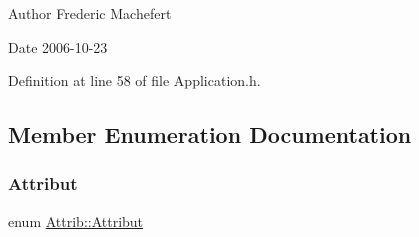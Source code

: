 \begin{DoxyAuthor}{Author}
Frederic Machefert 
\end{DoxyAuthor}
\begin{DoxyDate}{Date}
2006-\/10-\/23 
\end{DoxyDate}


Definition at line 58 of file Application.\+h.



\subsection{Member Enumeration Documentation}
\mbox{\label{classAttrib_a69e171d7cc6417835a5a306d3c764235}} 
\subsubsection{\texorpdfstring{Attribut}{Attribut}}
{\footnotesize\ttfamily enum \hyperlink{classAttrib_a69e171d7cc6417835a5a306d3c764235}{Attrib\+::\+Attribut}\hspace{0.3cm}{\ttfamily [inherited]}}


